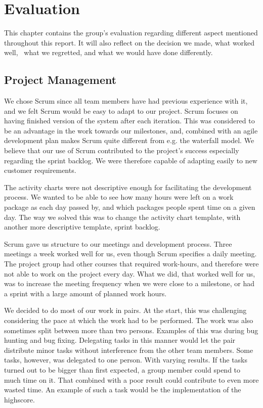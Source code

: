 \chapter{Evaluation}
\label{chapter:eval}

This chapter contains the group's evaluation regarding
different aspect mentioned throughout this report. It will also reflect
on the decision we made, what worked well, \ what we regretted, and
what we would have done differently. 

\section{Project Management}

We chose Scrum since all team members have had previous experience with
it, and we felt Scrum would be easy to adapt to our project. Scrum
focuses on having finished version of the system after each iteration.
This was considered to be an advantage in the work towards our
milestones, and, combined with an agile development plan makes Scrum
quite different from e.g. the waterfall model. We believe that our use
of Scrum contributed to the project's success
especially regarding the sprint backlog. We were therefore capable of
adapting easily to new customer requirements. 

The activity charts were not descriptive enough for facilitating the
development process. We wanted to be able to see how many hours were
left on a work package as each day passed by, and which packages people
spent time on a given day. The way we solved this was to change the
activity chart template, with another more descriptive template, sprint
backlog. 

Scrum gave us structure to our meetings and development process. Three
meetings a week worked well for us, even though Scrum specifies a daily
meeting. The project group had other courses that required work-hours,
and therefore were not able to work on the project every day. What we
did, that worked well for us, was to increase the meeting frequency
when we were close to a milestone, or had a sprint with a large amount
of planned work hours. 

We decided to do most of our work in pairs. At the start, this was
challenging considering the pace at which the work had to be performed.
The work was also sometimes split between more than two persons.
Examples of this was during bug hunting and bug fixing. Delegating
tasks in this manner would let the pair distribute minor tasks without
interference from the other team members. Some tasks, however, was
delegated to one person. With varying results. If the tasks turned out
to be bigger than first expected, a group member could spend to much
time on it. That combined with a poor result could contribute to even
more wasted time. An example of such a task would be the implementation
of the highscore. 

